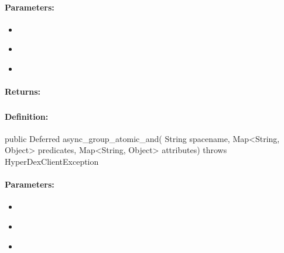 \paragraph{Parameters:}
\begin{itemize}[noitemsep]
\item {}\\

\item {}\\

\item {}\\

\end{itemize}

\paragraph{Returns:}


\pagebreak
\subsubsection{}
\label{api:java:async_group_atomic_and}


\paragraph{Definition:}
\begin{javacode}
public Deferred async_group_atomic_and(
        String spacename,
        Map<String, Object> predicates,
        Map<String, Object> attributes) throws HyperDexClientException
\end{javacode}

\paragraph{Parameters:}
\begin{itemize}[noitemsep]
\item {}\\

\item {}\\

\item {}\\

\end{itemize}

